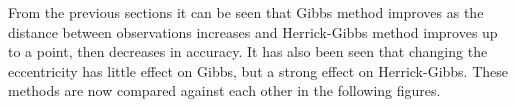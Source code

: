 \documentclass[12pt]{article}
\begin{document}
	From the previous sections it can be seen  that Gibbs method improves as the distance between observations increases and Herrick-Gibbs method improves up to a point, then decreases in accuracy. It has also been seen that changing the eccentricity has little effect on Gibbs, but a strong effect on Herrick-Gibbs. These methods are now compared against each other in the following figures. 

\end{document}
